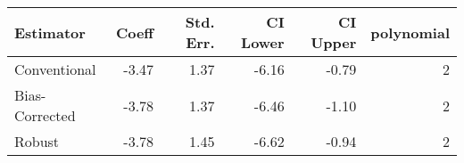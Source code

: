 \begin{tabular}{lrrrrr}
  \hline
Estimator & Coeff & Std. Err. & CI Lower & CI Upper & polynomial \\ 
  \hline
Conventional & -3.47 & 1.37 & -6.16 & -0.79 &   2 \\ 
  Bias-Corrected & -3.78 & 1.37 & -6.46 & -1.10 &   2 \\ 
  Robust & -3.78 & 1.45 & -6.62 & -0.94 &   2 \\ 
   \hline
\end{tabular}
